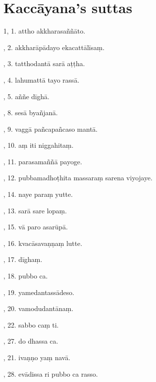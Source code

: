 \cleardoublepage
{}
{}
\chapter*{Kaccāyana's suttas}


1, 1. attho akkharasaññāto.\hfill \pageref{sut:1}\par {}, 2. akkharāpādayo ekacattālīsaṃ.\hfill \pageref{sut:2}\par {}, 3. tatthodantā sarā aṭṭha.\hfill \pageref{sut:3}\par {}, 4. lahumattā tayo rassā.\hfill \pageref{sut:4}\par {}, 5. aññe dīghā.\hfill \pageref{sut:5}\par {}, 8. sesā byañjanā.\hfill \pageref{sut:6}\par {}, 9. vaggā pañcapañcaso mantā.\hfill \pageref{sut:7}\par {}, 10. aṃ iti niggahitaṃ.\hfill \pageref{sut:8}\par {}, 11. parasamaññā payoge.\hfill \pageref{sut:9}\par {}, 12. pubbamadhoṭhita massaraṃ sarena viyojaye.\hfill \pageref{sut:10}\par {}, 14. naye paraṃ yutte.\hfill \pageref{sut:11}\par {}, 13. sarā sare lopaṃ.\hfill \pageref{sut:12}\par {}, 15. vā paro asarūpā.\hfill \pageref{sut:13}\par {}, 16. kvacāsavaṇṇaṃ lutte.\hfill \pageref{sut:14}\par {}, 17. dīghaṃ.\hfill \pageref{sut:15}\par {}, 18. pubbo ca.\hfill \pageref{sut:16}\par {}, 19. yamedantassādeso.\hfill \pageref{sut:17}\par {}, 20. vamodudantānaṃ.\hfill \pageref{sut:18}\par {}, 22. sabbo caṃ ti.\hfill \pageref{sut:19}\par {}, 27. do dhassa ca.\hfill \pageref{sut:20}\par {}, 21. ivaṇṇo yaṃ navā.\hfill \pageref{sut:21}\par {}, 28. evādissa ri pubbo ca rasso.\hfill \pageref{sut:22}\par \noindent
